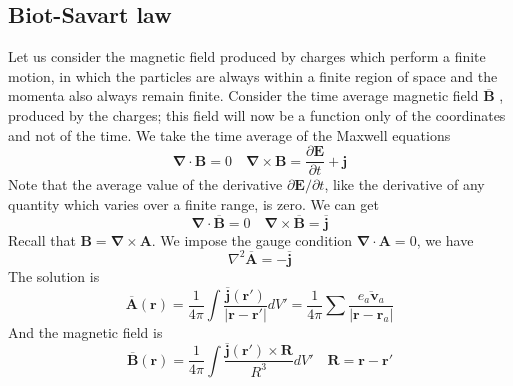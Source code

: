 \documentclass[cyan]{elegantnote}
\begin{document}
\subsection{Biot-Savart law}
Let us consider the magnetic field produced by charges which perform a finite motion, in which the particles are always within a finite region of space and the momenta also always remain finite. Consider the time average magnetic field $\overline{\bm{B}}$ , produced by the charges; this field will now be a function only of the coordinates and not of the time. We take the time average of the Maxwell equations
\[\bm{\nabla} \cdot \bm{B} = 0 \quad \bm{\nabla} \times \bm{B} = \frac{\partial \bm{E}}{\partial t} + \bm{j}\] 
Note that the average value of the derivative $\partial \bm{E} / \partial t$, like the derivative of any quantity which varies over a finite range, is zero. We can get
\[\bm{\nabla} \cdot \overline{\bm{B}} = 0 \quad \bm{\nabla} \times \overline{\bm{B}} =  \overline{\bm{j}}\]
Recall that $\bm{B} = \bm{\nabla} \times \bm{A}$. We impose the gauge condition $\bm{\nabla} \cdot \bm{A} = 0$, we have
\[\nabla^2 \overline{\bm{A}} = - \overline{\bm{j}}\]
The solution is
\[\overline{\bm{A}}(\bm{r}) = \frac{1}{4\pi} \int \frac{\overline{\bm{j}}(\bm{r}')}{|\bm{r}-\bm{r}'|} dV' = \frac{1}{4\pi} \sum \overline{\frac{e_a \bm{v}_a}{|\bm{r}-\bm{r}_a|}}\]
And the magnetic field is
\[\overline{\bm{B}}(\bm{r}) = \frac{1}{4\pi} \int \frac{\overline{\bm{j}}(\bm{r}') \times \bm{R}}{R^3} dV' \quad \bm{R} = \bm{r}-\bm{r}'\]
\end{document}
